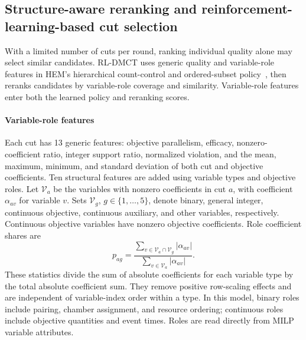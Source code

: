 \documentclass[final,5p,times,twocolumn]{elsarticle}
\begin{document}
\subsection{Structure-aware reranking and reinforcement-learning-based cut selection}
\label{sec:hem-extension-cn}
With a limited number of cuts per round, ranking individual quality alone may select similar candidates. RL-DMCT uses generic quality and variable-role features in HEM's hierarchical count-control and ordered-subset policy~\citep{wang2023hem}, then reranks candidates by variable-role coverage and similarity. Variable-role features enter both the learned policy and reranking scores.

\paragraph{Variable-role features}
Each cut has 13 generic features: objective parallelism, efficacy, nonzero-coefficient ratio, integer support ratio, normalized violation, and the mean, maximum, minimum, and standard deviation of both cut and objective coefficients. Ten structural features are added using variable types and objective roles. Let $\mathcal V_a$ be the variables with nonzero coefficients in cut $a$, with coefficient $\alpha_{av}$ for variable $v$. Sets $\mathcal V_g$, $g\in\{1,\ldots,5\}$, denote binary, general integer, continuous objective, continuous auxiliary, and other variables, respectively. Continuous objective variables have nonzero objective coefficients. Role coefficient shares are
\begin{equation}
p_{ag}=\frac{\sum_{v\in\mathcal V_a\cap\mathcal V_g}|\alpha_{av}|}
{\sum_{v\in\mathcal V_a}|\alpha_{av}|}.
\label{eq:role-profile-cn}
\end{equation}
These statistics divide the sum of absolute coefficients for each variable type by the total absolute coefficient sum. They remove positive row-scaling effects and are independent of variable-index order within a type. In this model, binary roles include pairing, chamber assignment, and resource ordering; continuous roles include objective quantities and event times. Roles are read directly from MILP variable attributes.
\end{document}
